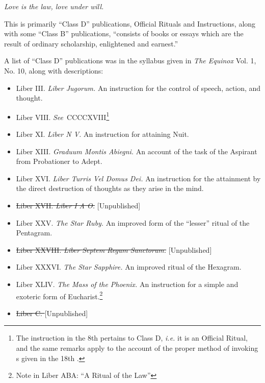 \textit{Love is the law, love under will.}



This is primarily \enquote{Class D} publications, Official Rituals and Instructions, along with some \enquote{Class B} publications, \enquote{consists of books or essays which are the result of ordinary scholarship, enlightened and earnest.}

A list of \enquote{Class D} publications was in the syllabus given in \textit{The Equinox} Vol. 1, No. 10, along with descriptions:

\begin{itemize}
\item Liber III. \textemdash{} \textit{Liber Jugorum.} An instruction for the control of speech, action, and thought.
\item Liber VIII. \textit{See}{}\-\ CCCCXVIII\footnote{The instruction in the 8th \AEthyr{} pertains to Class D, \textit{i.e.} it is an Official Ritual, and the same remarks apply to the account of the proper method of invoking \AEthyr{}s given in the 18th \AEthyr.\footnotemark}
\item Liber XI. \textemdash{} \textit{Liber N V.} An instruction for attaining Nuit.
\item Liber XIII. \textemdash{} \textit{Graduum Montis Abiegni.} An account of the task of the Aspirant from Probationer to Adept.
\item Liber XVI. \textemdash{} \textit{Liber Turris Vel Domus Dei.} An instruction for the attainment by the direct destruction of thoughts as they arise in the mind.
\item \sout{Liber XVII. \textemdash{} \textit{Liber I A O.}} [Unpublished]
\item Liber XXV. \textemdash{} \textit{The Star Ruby.} An improved form of the \enquote{lesser} ritual of the Pentagram.
\item \sout{Liber XXVIII. \textemdash{} \textit{Liber Septem Regum Sanctorum.}} [Unpublished]
\item Liber XXXVI. \textemdash{} \textit{The Star Sapphire.} An improved ritual of the Hexagram.
\item Liber XLIV. \textemdash{} \textit{The Mass of the Phoenix.} An instruction for a simple and exoteric form of Eucharist.\footnote{Note in Liber ABA: \enquote{A Ritual of the Law}}
\item \sout{Liber C. \textemdash{} \textit{}} [Unpublished]

\end{itemize}
